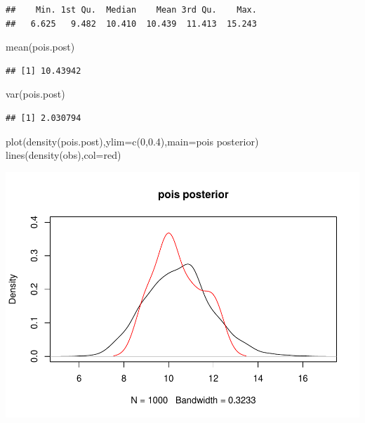 \documentclass[
]{book}
\newenvironment{Shaded}{\begin{snugshade}}{\end{snugshade}}
\newcommand{\AttributeTok}[1]{\textcolor[rgb]{0.77,0.63,0.00}{#1}}
\newcommand{\DecValTok}[1]{\textcolor[rgb]{0.00,0.00,0.81}{#1}}
\newcommand{\FloatTok}[1]{\textcolor[rgb]{0.00,0.00,0.81}{#1}}
\newcommand{\FunctionTok}[1]{\textcolor[rgb]{0.00,0.00,0.00}{#1}}
\newcommand{\NormalTok}[1]{#1}
\newcommand{\StringTok}[1]{\textcolor[rgb]{0.31,0.60,0.02}{#1}}
\theoremstyle{definition}
\theoremstyle{definition}
\theoremstyle{definition}
\theoremstyle{definition}
\theoremstyle{remark}
\begin{document}
\begin{verbatim}
##    Min. 1st Qu.  Median    Mean 3rd Qu.    Max. 
##   6.625   9.482  10.410  10.439  11.413  15.243
\end{verbatim}

\begin{Shaded}
\begin{Highlighting}[]
  \FunctionTok{mean}\NormalTok{(pois.post)}
\end{Highlighting}
\end{Shaded}

\begin{verbatim}
## [1] 10.43942
\end{verbatim}

\begin{Shaded}
\begin{Highlighting}[]
  \FunctionTok{var}\NormalTok{(pois.post)}
\end{Highlighting}
\end{Shaded}

\begin{verbatim}
## [1] 2.030794
\end{verbatim}

\begin{Shaded}
\begin{Highlighting}[]
  \FunctionTok{plot}\NormalTok{(}\FunctionTok{density}\NormalTok{(pois.post),}\AttributeTok{ylim=}\FunctionTok{c}\NormalTok{(}\DecValTok{0}\NormalTok{,}\FloatTok{0.4}\NormalTok{),}\AttributeTok{main=}\StringTok{\textquotesingle{}pois posterior\textquotesingle{}}\NormalTok{)}
  \FunctionTok{lines}\NormalTok{(}\FunctionTok{density}\NormalTok{(obs),}\AttributeTok{col=}\StringTok{\textquotesingle{}red\textquotesingle{}}\NormalTok{)}
\end{Highlighting}
\end{Shaded}

\includegraphics{_main_files/figure-latex/unnamed-chunk-39-2.pdf}
\end{document}
